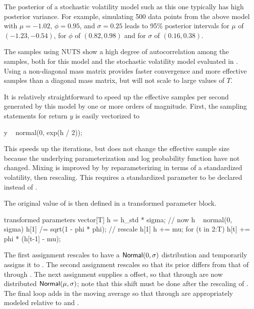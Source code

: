 The posterior of a stochastic volatility model such as this one
typically has high posterior variance.  For example, simulating 500
data points from the above model with $\mu = -1.02$, $\phi = 0.95$,
and $\sigma = 0.25$ leads to 95\% posterior intervals for $\mu$ of
$(-1.23, -0.54)$, for $\phi$ of $(0.82,0.98 )$ and for $\sigma$ of
$(0.16,0.38)$.

The samples using NUTS show a high degree of autocorrelation among the
samples, both for this model and the stochastic volatility model
evaluated in \citep{Hoffman-Gelman:2011, Hoffman-Gelman:2014}.
Using a non-diagonal mass
matrix provides faster convergence and more effective samples than a
diagonal mass matrix, but will not scale to large values of $T$.

It is relatively straightforward to speed up the effective samples per
second generated by this model by one or more orders of magnitude.
First, the sampling statements for return $y$ is easily vectorized to
%
\begin{stancode}
y ~ normal(0, exp(h / 2));
\end{stancode}
%
This speeds up the iterations, but does not change the effective
sample size because the underlying parameterization and log
probability function have not changed.  Mixing is improved by by
reparameterizing in terms of a standardized volatility, then
rescaling.  This requires a standardized parameter  to be
declared instead of .
\begin{stancode}
parameters {
  ...
  vector[T] h_std;             // std log volatility time t
\end{stancode}
%
The original value of  is then defined in a transformed
parameter block.
%
\begin{stancode}
transformed parameters {
  vector[T] h = h_std * sigma;  // now h ~ normal(0, sigma)
  h[1] /= sqrt(1 - phi * phi);  // rescale h[1]
  h += mu;
  for (t in 2:T)
    h[t] += phi * (h[t-1] - mu);
}
\end{stancode}
%
The first assignment rescales  to have a
$\mbox{\sf Normal}(0,\sigma)$ distribution and temporarily assigns it to
.  The second assignment rescales  so that its
prior differs from that of  through .  The next
assignment supplies a  offset, so that  through
 are now distributed $\mbox{\sf Normal}(\mu,\sigma)$; note
that this shift must be done after the rescaling of .  The
final loop adds in the moving average so that  through
 are appropriately modeled relative to  and
.

